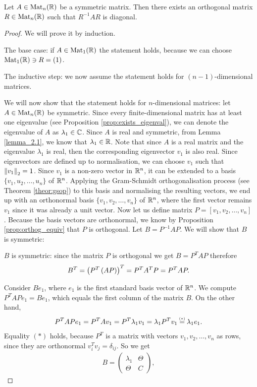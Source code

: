\begin{lemma}\label{lem:ortn_basis}
    Let $A\in\text{Mat}_n(\mathbb{R})$ be a symmetric matrix. Then there exists an orthogonal matrix $R\in\text{Mat}_n(\mathbb{R})$ such that $R^{-1}AR$ is diagonal. 
\end{lemma}
\begin{proof}
We will prove it by induction.

The base case: if $A\in \text{Mat}_1(\mathbb{R})$ the statement holds, because we can choose $\text{Mat}_1(\mathbb{R})\ni R=(1)$.

The inductive step: we now assume the statement holds for $(n-1)$-dimensional matrices. 

We will now show that the statement holds for $n$-dimensional matrices: let $A\in\text{Mat}_n(\mathbb{R})$ be symmetric. Since every finite-dimensional matrix has at least one eigenvalue (see Proposition \ref{prop:exists_eigenval}), we can denote the eigenvalue of $A$ as $\lambda_1\in\mathbb{C}$. Since $A$ is real and symmetric, from Lemma \ref{lemma_2.1}, we know that $\lambda_1\in\mathbb{R}$. Note that since $A$ is a real matrix and the eigenvalue $\lambda_1$ is real, then the corresponding eigenvector $v_1$ is also real.  Since eigenvectors are defined up to normalisation, we can choose $v_1$ such that $\left\lVert v_1\right\rVert_2=1$. Since $v_1$ is a non-zero vector in $\mathbb{R}^n$, it can be extended to a basis $\{v_1, u_2, \dots, u_n\}$ of $\mathbb{R}^n$. Applying the Gram-Schmidt orthogonalisation process (see Theorem \ref{theor:gsop}) to this basis and normalising the resulting vectors, we end up with an orthonormal basis $\{v_1, v_2, \dots, v_n\}$ of $\mathbb{R}^n$, where the first vector remains $v_1$ since it was already a unit vector. Now let us define matrix $P = [v_1, v_2,\dots, v_n]$. Because the basis vectors are orthonormal, we know by Proposition \ref{prop:orthog_equiv} that $P$ is orthogonal.  Let $B = P^{-1}AP$. We will show that $B$ is symmetric:

$B$ is symmetric: since the matrix $P$ is orthogonal we get 
$B=P^TAP$ therefore 
$$B^T = \left( P^T \left( AP\right)\right)^T =P^TA^TP = P^TAP.$$
    
Consider $Be_1$, where $e_1$ is the first standard basis vector of $\mathbb{R}^n$. We compute $P^TAPe_1 = Be_1$, which equals the first column of the matrix $B$. On the other hand, 
$$P^TAPe_1 =P^TAv_1 = P^T\lambda_1v_1 = \lambda_1P^Tv_1 \trn \lambda_1 e_1.$$
Equality $(\ast)$ holds, because $P^T$ is a matrix with vectors $v_1, v_2, \dots, v_n$ as rows, since they are orthonormal $v_i^Tv_j=\delta_{ij}$. So we get 
\begin{align*}
B =
    \left(
    \begin{array}{c|c}
    \lambda_1 & {\Theta} \\ \hline
    {\Theta} & C
    \end{array}
    \right),
\end{align*}


\end{proof}
